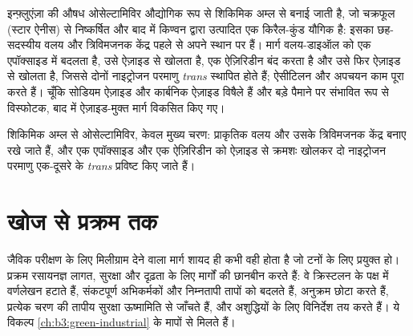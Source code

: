 इन्फ़्लुएंज़ा की औषध ओसेल्टामिविर औद्योगिक रूप से शिकिमिक अम्ल से बनाई जाती है, जो
चक्रफूल (स्टार ऐनीस) से निष्कर्षित और बाद में किण्वन द्वारा उत्पादित एक किरैल-कुंड यौगिक है:
इसका छह-सदस्यीय वलय और त्रिविमजनक केंद्र पहले से अपने स्थान पर हैं।
मार्ग वलय-डाइऑल को एक एपॉक्साइड में बदलता है, उसे ऐज़ाइड से खोलता है, एक
ऐज़िरिडीन बंद करता है और उसे फिर ऐज़ाइड से खोलता है, जिससे दोनों नाइट्रोजन परमाणु
\textit{trans} स्थापित होते हैं; ऐसीटिलन और अपचयन काम पूरा करते हैं। चूँकि सोडियम ऐज़ाइड और
कार्बनिक ऐज़ाइड विषैले हैं और बड़े पैमाने पर संभावित रूप से विस्फोटक, बाद में ऐज़ाइड-मुक्त
मार्ग विकसित किए गए।

\begin{omfigure}

{\small शिकिमिक अम्ल से ओसेल्टामिविर, केवल मुख्य चरण: प्राकृतिक वलय और उसके
त्रिविमजनक केंद्र बनाए रखे जाते हैं, और एक एपॉक्साइड और एक ऐज़िरिडीन को ऐज़ाइड से
क्रमशः खोलकर दो नाइट्रोजन परमाणु एक-दूसरे के \textit{trans} प्रविष्ट किए जाते हैं।}
\end{omfigure}

\section{खोज से प्रक्रम तक}

जैविक परीक्षण के लिए मिलीग्राम देने वाला मार्ग शायद ही कभी वही होता है जो
टनों के लिए प्रयुक्त हो। प्रक्रम रसायनज्ञ लागत, सुरक्षा और दृढ़ता के लिए मार्गों की छानबीन करते हैं:
वे क्रिस्टलन के पक्ष में वर्णलेखन हटाते हैं, संकटपूर्ण
अभिकर्मकों और निम्नतापी तापों को बदलते हैं, अनुक्रम छोटा करते हैं, प्रत्येक चरण की तापीय
सुरक्षा ऊष्मामिति से जाँचते हैं, और अशुद्धियों के लिए विनिर्देश तय करते हैं।
ये विकल्प \cref{ch:b3:green-industrial} के मापों से मिलते हैं।

